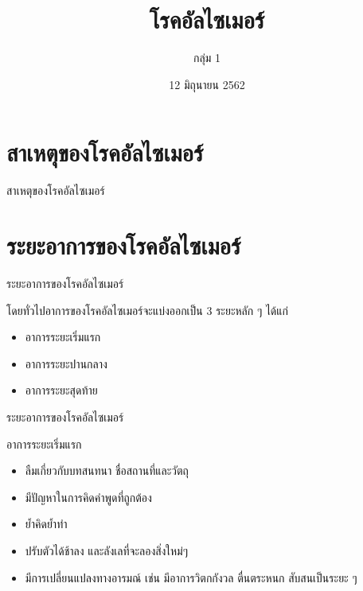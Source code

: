 \documentclass[xetex,serif]{beamer}
\title{โรคอัลไซเมอร์}
\author{กลุ่ม 1}
\date{12 มิถุนายน 2562}
\institute{ห้อง 39}
\begin{document}
\begin{frame}
    \maketitle
\end{frame}

\section{สาเหตุของโรคอัลไซเมอร์}

\begin{frame}{สาเหตุของโรคอัลไซเมอร์}

\end{frame}

\section{ระยะอาการของโรคอัลไซเมอร์}

\begin{frame}{ระยะอาการของโรคอัลไซเมอร์}

{\large โดยทั่วไปอาการของโรคอัลไซเมอร์จะแบ่งออกเป็น 3 ระยะหลัก ๆ ได้แก่}

\begin{itemize}
  \item อาการระยะเริ่มแรก 
  \item อาการระยะปานกลาง 
  \item อาการระยะสุดท้าย 
\end{itemize}
\end{frame}

\begin{frame}{ระยะอาการของโรคอัลไซเมอร์}

{\Large อาการระยะเริ่มแรก}

\begin{itemize}
  \item ลืมเกี่ยวกับบทสนทนา ชื่อสถานที่และวัตถุ 
  \item มีปัญหาในการคิดคำพูดที่ถูกต้อง 
  \item ย้ำคิดย้ำทำ 
  \item ปรับตัวได้ช้าลง และลังเลที่จะลองสิ่งใหม่ๆ 
  \item มีการเปลี่ยนแปลงทางอารมณ์ เช่น มีอาการวิตกกังวล ตื่นตระหนก สับสนเป็นระยะ ๆ
\end{itemize}
\end{frame}
\end{document}
